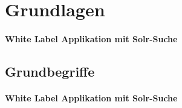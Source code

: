 %
\chapter{Grundlagen}
\label{sec:Grundlagen}

\subsubsection{White Label Applikation mit Solr-Suche}
\label{sec:Grundlagen:AufbauSucheBeiSpringerNature:WhiteLabelApplikationSolr-Suche}


\section{Grundbegriffe}
\label{sec:Grundlagen:Grundbegriffe}

\subsubsection{White Label Applikation mit Solr-Suche}
\label{sec:Grundlagen:AufbauSucheBeiSpringerNature:WhiteLabelApplikationSolr-Suche}

